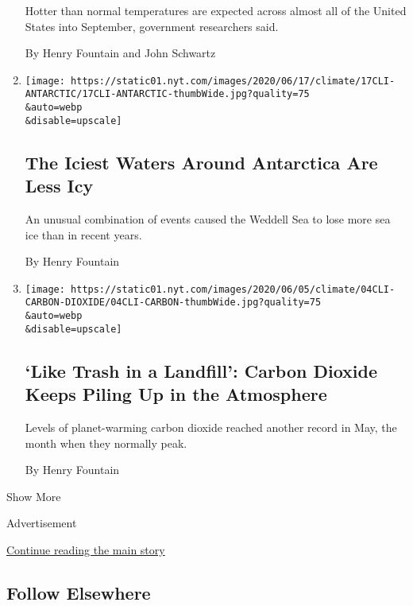 \begin{enumerate}
  Hotter than normal temperatures are expected across almost all of the
  United States into September, government researchers said.

  By Henry Fountain and John Schwartz
\item
  \href{/2020/06/17/climate/antarctica-sea-ice-climate-change.html}{}

  \texttt{[image: https://static01.nyt.com/images/2020/06/17/climate/17CLI-ANTARCTIC/17CLI-ANTARCTIC-thumbWide.jpg?quality=75\\\&auto=webp\\\&disable=upscale]}

  \hypertarget{the-iciest-waters-around-antarctica-are-less-icy}{%
  \subsection{The Iciest Waters Around Antarctica Are Less
  Icy}\label{the-iciest-waters-around-antarctica-are-less-icy}}

  An unusual combination of events caused the Weddell Sea to lose more
  sea ice than in recent years.

  By Henry Fountain
\item
  \href{/2020/06/04/climate/carbon-dioxide-record-climate-change.html}{}

  \texttt{[image: https://static01.nyt.com/images/2020/06/05/climate/04CLI-CARBON-DIOXIDE/04CLI-CARBON-thumbWide.jpg?quality=75\\\&auto=webp\\\&disable=upscale]}

  \hypertarget{like-trash-in-a-landfill-carbon-dioxide-keeps-piling-up-in-the-atmosphere}{%
  \subsection{`Like Trash in a Landfill': Carbon Dioxide Keeps Piling Up
  in the
  Atmosphere}\label{like-trash-in-a-landfill-carbon-dioxide-keeps-piling-up-in-the-atmosphere}}

  Levels of planet-warming carbon dioxide reached another record in May,
  the month when they normally peak.

  By Henry Fountain
\end{enumerate}

Show More

Advertisement

\protect\hyperlink{after-mid2}{Continue reading the main story}

\hypertarget{follow-elsewhere}{%
\subsection{Follow Elsewhere}\label{follow-elsewhere}}

